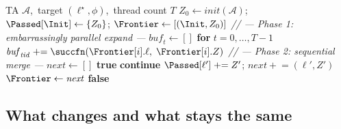 \begin{algorithm}[t]
\caption{Level-synchronous parallel BFS (OpenMP backend)}\label{alg:par}
\begin{algorithmic}[1]
\Require TA $\mathcal{A}$,\ target $(\ell^\star, \phi)$,\ thread count $T$
\State $Z_0 \leftarrow \mathit{init}(\mathcal{A})$;\enspace
       $\Passed[\Init] \leftarrow \{Z_0\}$;\enspace
       $\Frontier \leftarrow [(\Init, Z_0)]$
\While{$\Frontier \neq \emptyset$}
  \vspace{2pt}
  \State \textit{// --- Phase 1: embarrassingly parallel expand ---}
  \State $\mathit{buf}_t \leftarrow []$ \textbf{ for } $t = 0,\ldots,T{-}1$
    \State $\mathit{buf}_{\mathit{tid}} \mathrel{+}=
           \succfn(\Frontier[i].\ell,\; \Frontier[i].Z)$
  \EndParFor
  \vspace{2pt}
  \State \textit{// --- Phase 2: sequential merge ---}
  \State $\mathit{next} \leftarrow []$
     \Return \textbf{true} \EndIf
      \textbf{continue}
    \EndIf
    \State $\Passed[\ell'] \mathrel{+}= Z'$;\enspace
           $\mathit{next} \mathrel{+}= (\ell', Z')$
  \EndFor
  \State $\Frontier \leftarrow \mathit{next}$
\EndWhile
\Return \textbf{false}
\end{algorithmic}
\end{algorithm}

\subsection{What changes and what stays the same}

